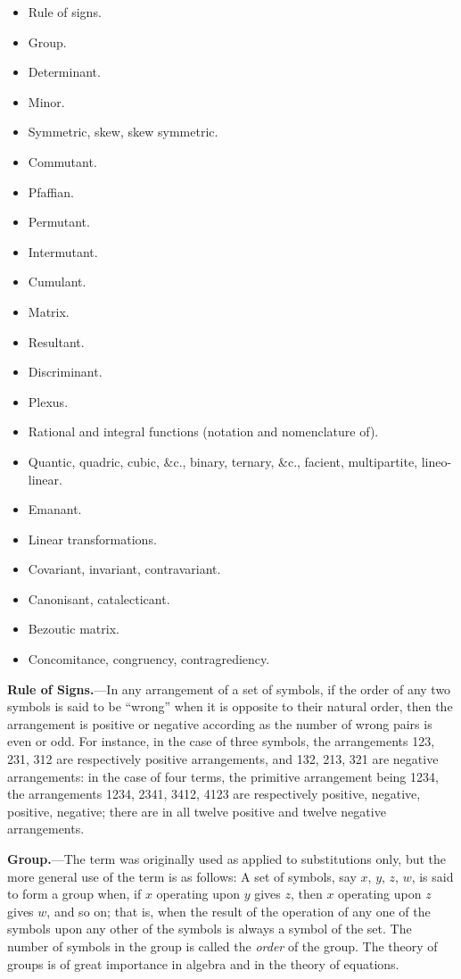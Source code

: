 \documentclass[11pt,a4paper]{book}
\begin{document}
\begin{itemize}[leftmargin=2em]
\item Rule of signs.
\item Group.
\item Determinant.
\item Minor.
\item Symmetric, skew, skew symmetric.
\item Commutant.
\item Pfaffian.
\item Permutant.
\item Intermutant.
\item Cumulant.
\item Matrix.
\item Resultant.
\item Discriminant.
\item Plexus.
\item Rational and integral functions (notation and nomenclature of).
\item Quantic, quadric, cubic, \&c., binary, ternary, \&c., facient, multipartite, lineo-linear.
\item Emanant.
\item Linear transformations.
\item Covariant, invariant, contravariant.
\item Canonisant, catalecticant.
\item Bezoutic matrix.
\item Concomitance, congruency, contragrediency.
\end{itemize}

\vspace{1em}

\noindent\textbf{Rule of Signs.}---In any arrangement of a set of symbols, if the order of any two symbols is said to be ``wrong'' when it is opposite to their natural order, then the arrangement is positive or negative according as the number of wrong pairs is even or odd. For instance, in the case of three symbols, the arrangements 123, 231, 312 are respectively positive arrangements, and 132, 213, 321 are negative arrangements: in the case of four terms, the primitive arrangement being 1234, the arrangements 1234, 2341, 3412, 4123 are respectively positive, negative, positive, negative; there are in all twelve positive and twelve negative arrangements.

\vspace{1em}

\noindent\textbf{Group.}---The term was originally used as applied to substitutions only, but the more general use of the term is as follows: A set of symbols, say $x$, $y$, $z$, $w$, is said to form a group when, if $x$ operating upon $y$ gives $z$, then $x$ operating upon $z$ gives $w$, and so on; that is, when the result of the operation of any one of the symbols upon any other of the symbols is always a symbol of the set. The number of symbols in the group is called the \textit{order} of the group. The theory of groups is of great importance in algebra and in the theory of equations.
\end{document}
